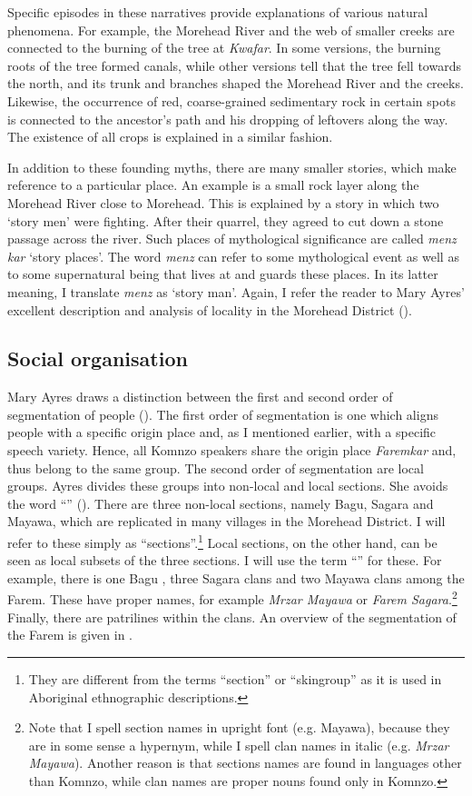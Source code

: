 Specific episodes in these narratives provide explanations of various natural phenomena. For example, the Morehead River and the web of smaller creeks are connected to the burning of the tree at \emph{Kwafar}. In some versions, the burning roots of the tree formed canals, while other versions tell that the tree fell towards the north, and its trunk and branches shaped the Morehead River and the creeks. Likewise, the occurrence of red, coarse-grained sedimentary rock in certain spots is connected to the ancestor's path and his dropping of leftovers along the way. The existence of all crops is explained in a similar fashion.

In addition to these founding myths, there are many smaller stories, which make reference to a particular place. An example is a small rock layer along the Morehead River close to Morehead. This is explained by a story in which two `story men' were fighting. After their quarrel, they agreed to cut down a stone passage across the river. Such places of mythological significance are called \emph{menz kar} `story places'. The word \emph{menz} can refer to some mythological event as well as to some supernatural being that lives at and guards these places. In its latter meaning, I translate \emph{menz} as `story man'. Again, I refer the reader to Mary Ayres' excellent description and analysis of locality in the Morehead District (\citealt{Ayres:ws}).

\subsection{Social organisation}\label{segmentationofpeople}

Mary Ayres draws a distinction between the first and second order of segmentation of people (\citeyear[126]{Ayres:ws}). The first order of segmentation is one which aligns people with a specific origin place and, as I mentioned earlier, with a specific speech variety. Hence, all Komnzo speakers share the origin place \emph{Faremkar} and, thus belong to the same group. The second order of segmentation are local groups. Ayres divides these groups into non-local and local sections. She avoids the word ``'' (\citeyear[142]{Ayres:ws}). There are three non-local sections, namely Bagu, Sagara and Mayawa, which are replicated in many villages in the Morehead District. I will refer to these simply as ``sections''.\footnote{They are different from the terms ``section'' or ``skingroup'' as it is used in Aboriginal ethnographic descriptions.} Local sections, on the other hand, can be seen as local subsets of the three sections. I will use the term ``'' for these. For example, there is one Bagu , three Sagara clans and two Mayawa clans among the Farem. These have proper names, for example \emph{Mrzar Mayawa} or \emph{Farem Sagara}.\footnote{Note that I spell section names in upright font (e.g. Mayawa), because they are in some sense a hypernym, while I spell clan names in italic (e.g. \emph{Mrzar Mayawa}). Another reason is that sections names are found in languages other than Komnzo, while clan names are proper nouns found only in Komnzo.} Finally, there are patrilines within the clans. An overview of the segmentation of the Farem is given in .

